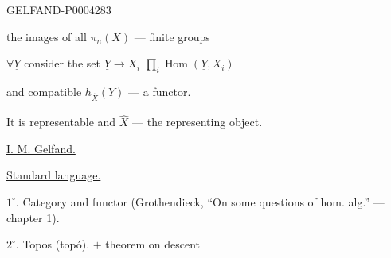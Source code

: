 \begin{GelfandAdjacentEvidence}{GELFAND-P000428}{3}


the images of all $\pi_n (X)$ --- finite groups

$\forall\underline{Y}$ consider the set $\underline{Y}\longrightarrow X_i$
\qquad $\prod_i\operatorname{Hom}(\underline{Y}, X_i)$

and compatible $\underline{h_{\widehat X}(\underline{Y})}$ --- a functor.


It is representable and $\widehat X$ --- the representing object.

\begin{center}
\begingroup\color{black}\endgroup
\end{center}



\underline{I. M. Gelfand.}

\underline{Standard language.}

$1^\circ$. Category and functor (Grothendieck, “On some questions of hom. alg.” --- chapter 1).

$2^\circ$. Topos (topó). $+$ theorem on descent
\end{GelfandAdjacentEvidence}
